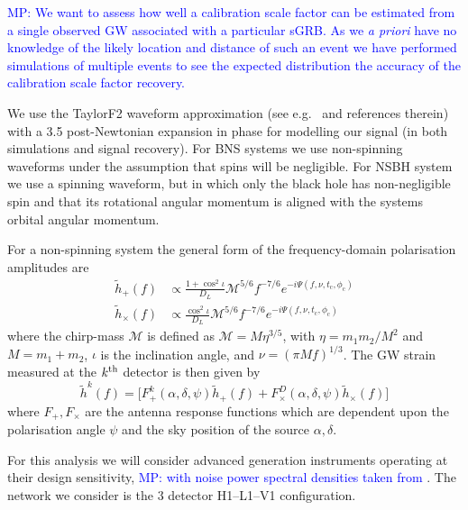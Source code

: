 \documentclass[10pt]{iopart}
\newcommand{\gws}{\tilde{h}}
\newcommand{\MP}[1]{\textcolor{blue}{MP: #1}}
\begin{document}
\MP{We want to assess how well a calibration scale factor can be estimated
from a single observed \ac{GW} associated with a particular \ac{sGRB}. As we {\it a priori}
have no knowledge of the likely location and distance of such an event we have performed
simulations of multiple events to see the expected distribution the accuracy of the
calibration scale factor recovery.}

We use the TaylorF2 waveform approximation (see e.g.\ \cite{2009PhRvD..80h4043B} and references 
therein) with a 3.5 post-Newtonian expansion in phase for modelling our signal (in both simulations 
and signal recovery).  For \ac{BNS} systems we use non-spinning waveforms under the assumption that 
spins will be negligible. For \ac{NSBH} system we use a spinning waveform, but in which only the 
black hole has non-negligible spin and that its rotational angular momentum is aligned with the 
systems orbital angular momentum.

For a non-spinning system the general form of the frequency-domain polarisation amplitudes are
%
\begin{eqnarray}\label{eq:signal}
  \gws_{+}(f) &\propto \frac{1+\cos^{2}\iota}{D_{L}}
\mathcal{M}^{5/6}f^{-7/6}e^{-i\Psi(f, \nu, t_\mathrm{c}, \phi_{\mathrm{c}})} \nonumber \\
  \gws_{\times}(f) &\propto
 \frac{\cos^{2}\iota}{D_{L}}\mathcal{M}^{5/6} f^{-7/6}e^{-i\Psi(f, \nu, t_\mathrm{c}, 
\phi_{\mathrm{c}})}
\end{eqnarray}
%
where the chirp-mass $\mathcal{M}$ is defined as $\mathcal{M}=M\eta^{3/5}$, with 
$\eta=m_{1}m_{2}/M^{2}$ and $M=m_{1}+m_{2}$, $\iota$ is the inclination angle, and $\nu=(\pi 
Mf)^{1/3}$.  The \ac{GW} strain measured at the $k^{\rm{th}}$ detector is then given by
%
\begin{equation}
  \label{eq:gravsig}
   \gws^{k}(f) = \big[ F_{+}^{k}(\alpha, \delta, \psi)\gws_{+}(f) +
F_{\times}^D(\alpha, \delta, \psi)\gws_{\times}(f)\big]
\end{equation}
%
where $F_{+},F_{\times}$ are the antenna response functions which are dependent
upon the polarisation angle $\psi$ and the sky position of the source
$\alpha,\delta$.

For this analysis we will consider advanced generation instruments operating
at their design sensitivity, \MP{with noise power spectral densities taken from
\cite{2013arXiv1304.0670L}}. The network we consider is the 3 detector H1--L1--V1 configuration. 
\end{document}
